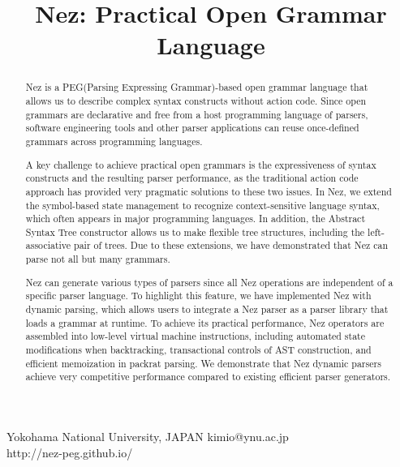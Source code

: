 \documentclass[preprint]{sigplanconf}
\begin{document}
\setlength{\pdfpageheight}{\paperheight}
\setlength{\pdfpagewidth}{\paperwidth}






\permissiontopublish             


\title{Nez: Practical Open Grammar Language}


         {Yokohama National University, JAPAN}
         {kimio@ynu.ac.jp\\http://nez-peg.github.io/}



\maketitle

\begin{abstract}

Nez is a PEG(Parsing Expressing Grammar)-based open grammar language that allows us to describe complex syntax constructs without action code. Since open grammars are declarative and free from a host programming language of parsers, software engineering tools and other parser applications can reuse once-defined grammars across programming languages. 

A key challenge to achieve practical open grammars is the expressiveness of syntax constructs and the resulting parser performance, as the traditional action code approach has provided very pragmatic solutions to these two issues. In Nez, we extend the symbol-based state management to recognize context-sensitive language syntax, which often appears in major programming languages. In addition, the Abstract Syntax Tree constructor allows us to make flexible tree structures, including the left-associative pair of trees. Due to these extensions, we have demonstrated that Nez can parse not all but many grammars.

Nez can generate various types of parsers since all Nez operations are independent of a specific parser language. To highlight this feature, we have implemented Nez with dynamic parsing, which allows users to integrate a Nez parser as a parser library that loads a grammar at runtime. To achieve its practical performance, Nez operators are assembled into low-level virtual machine instructions, including automated state modifications when backtracking, transactional controls of AST construction, and efficient memoization in packrat parsing. We demonstrate that Nez dynamic parsers achieve very competitive performance compared to existing efficient parser generators. 

\end{abstract}
\end{document}
